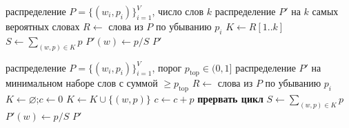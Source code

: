 \documentclass[a4paper,12pt]{article}
\begin{document}
\begin{algorithm}
\caption{Top-k фильтрация}\label{alg:topk}
\begin{algorithmic}[1]
\Require распределение $P=\{(w_i,p_i)\}_{i=1}^{V}$, число слов $k$
\Ensure распределение $P'$ на $k$ самых вероятных словах
\State $R \gets$ слова из $P$ по убыванию $p_i$ 
\State $K \gets R[1..k]$ 
\State $S \gets \sum_{(w,p)\in K} p$
    \State $P'(w) \gets p / S$ 
\EndFor
\State \Return $P'$
\end{algorithmic}
\end{algorithm}

\begin{algorithm}
\caption{Top-p (nucleus) фильтрация}\label{alg:topp}
\begin{algorithmic}[1]
\Require распределение $P=\{(w_i,p_i)\}_{i=1}^{V}$, порог $p_{\text{top}}\in(0,1]$
\Ensure распределение $P'$ на минимальном наборе слов с суммой $\ge p_{\text{top}}$
\State $R \gets$ слова из $P$ по убыванию $p_i$ 
\State $K \gets \varnothing$;\quad $c \gets 0$
    \State $K \gets K \cup \{(w,p)\}$
    \State $c \gets c + p$ 
        \State \textbf{прервать цикл}
    \EndIf
\EndFor
\State $S \gets \sum_{(w,p)\in K} p$
    \State $P'(w) \gets p / S$
\EndFor
\State \Return $P'$
\end{algorithmic}
\end{algorithm}
\end{document}
